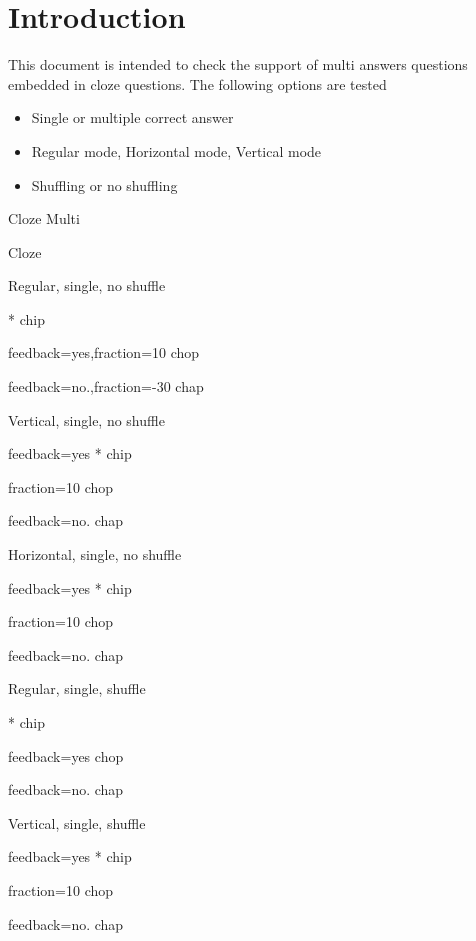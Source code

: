 \documentclass{article}
\begin{document}
\section*{Introduction}

This document is intended to check the support of multi answers questions 
embedded in cloze questions. The following options are tested
\begin{itemize}
	\item Single or multiple correct answer
	\item Regular mode, Horizontal mode, Vertical mode
	\item Shuffling or no shuffling
\end{itemize}

\begin{quiz}{Cloze Multi}

\begin{cloze}{Cloze}
\begin{multi}[shuffle=false]
Regular, single, no shuffle
\item[]* chip
\item[feedback={yes},fraction=10] chop
\item[feedback={no.},fraction=-30] chap
\end{multi}

\begin{multi}[shuffle=false,vertical]
Vertical, single, no shuffle
\item[feedback={yes}]* chip
\item[fraction=10] chop
\item[feedback={no.}] chap
\end{multi}

\begin{multi}[shuffle=false,horizontal]
Horizontal, single, no shuffle
\item[feedback={yes}]* chip
\item[fraction=10] chop
\item[feedback={no.}] chap
\end{multi}

\begin{multi}[shuffle=true]
	Regular, single, shuffle
	\item[]* chip
	\item[feedback={yes}] chop
	\item[feedback={no.}] chap
\end{multi}

\begin{multi}[shuffle=true,vertical]
	Vertical, single, shuffle
	\item[feedback={yes}]* chip
	\item[fraction=10] chop
	\item[feedback={no.}] chap
\end{multi}


\end{cloze}
\end{quiz}
\end{document}
